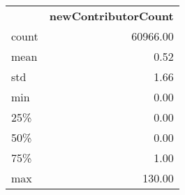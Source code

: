 \begin{tabular}{lr}
 & \textbf{newContributorCount} \\
count & 60966.00 \\
mean & 0.52 \\
std & 1.66 \\
min & 0.00 \\
25\% & 0.00 \\
50\% & 0.00 \\
75\% & 1.00 \\
max & 130.00 \\
\end{tabular}
